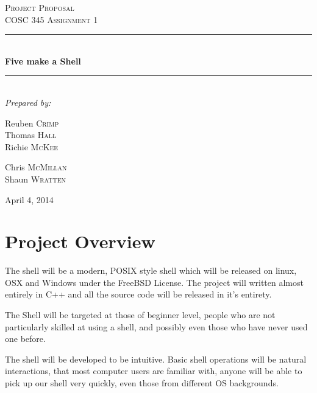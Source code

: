 \documentclass[a4paper,12pt]{article}
\begin{document}
\begin{titlepage}

  \newcommand{\HRule}{\rule{\linewidth}{0.5mm}}
  \begin{center}
    \textsc{\LARGE Project Proposal}\\[0.5cm] 
    \textsc{\large COSC 345 Assignment 1}\\[0.5cm] 

    \HRule \\[0.6cm]
           { \huge \bfseries Five make a Shell}\\[0.4cm]
           \HRule \\[1.5cm]
           
           \Large \emph{Prepared by:}\\
           \begin{multicols}{3}
             Reuben \textsc{Crimp}\\
             Thomas \textsc{Hall}\\
             Richie \textsc{McKee}\\           
           \end{multicols}
           \begin{multicols}{2}
             Chris \textsc{McMillan}\\
             Shaun \textsc{Wratten}\\           
           \end{multicols}

  
  \null\vfill{\small April 4, 2014}\\[3cm]
  \end{center}
\end{titlepage}
\section*{Project Overview}
The shell will be a modern, POSIX style shell which will be released on linux, OSX and Windows under the FreeBSD License. The project will written almost entirely in C++ and all the source code will be released in it's entirety.

The Shell will be targeted at those of beginner level, people who are not particularly skilled at using a shell, and possibly even those who have never used one before.

The shell will be developed to be intuitive. Basic shell operations will be natural interactions, that most computer users are familiar with, anyone will be able to pick up our shell very quickly, even those from different OS backgrounds.
\end{document}
